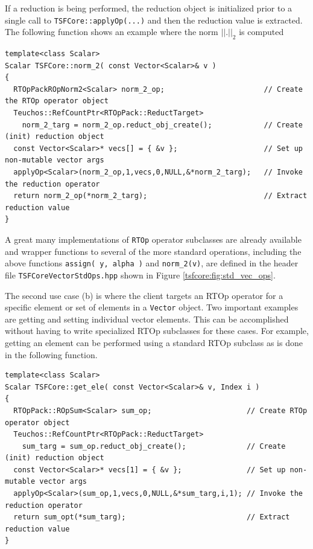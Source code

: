 If a reduction is being performed, the reduction object is initialized
prior to a single call to \texttt{TSFCore::applyOp(\-...)} and then the
reduction value is extracted.  The following function shows an example
where the norm $||.||_2$ is computed

{\scriptsize\begin{verbatim}
template<class Scalar>
Scalar TSFCore::norm_2( const Vector<Scalar>& v )
{
  RTOpPackROpNorm2<Scalar> norm_2_op;                       // Create the RTOp operator object
  Teuchos::RefCountPtr<RTOpPack::ReductTarget>
    norm_2_targ = norm_2_op.reduct_obj_create();            // Create (init) reduction object
  const Vector<Scalar>* vecs[] = { &v };                    // Set up non-mutable vector args
  applyOp<Scalar>(norm_2_op,1,vecs,0,NULL,&*norm_2_targ);   // Invoke the reduction operator
  return norm_2_op(*norm_2_targ);                           // Extract reduction value
}
\end{verbatim}}

{}\noindent{}A great many implementations of \texttt{RTOp} operator subclasses are
already available and wrapper functions to several of the more
standard operations, including the above functions
\texttt{assign( y, alpha )} and \texttt{norm\_2(v)},
are defined in the header file \texttt{TSFCore\-Vector\-Std\-Ops.hpp}
shown in Figure \ref{tsfcore:fig:std_vec_ops}.

The second use case (b) is where the client targets an RTOp operator
for a specific element or set of elements in a \texttt{Vector} object.
Two important examples are getting and setting individual vector
elements.  This can be accomplished without having to write specialized
RTOp subclasses for these cases.  For example, getting an element
can be performed using a standard RTOp subclass as is done
in the following function.

{\scriptsize\begin{verbatim}
template<class Scalar>
Scalar TSFCore::get_ele( const Vector<Scalar>& v, Index i )
{
  RTOpPack::ROpSum<Scalar> sum_op;                      // Create RTOp operator object
  Teuchos::RefCountPtr<RTOpPack::ReductTarget>
    sum_targ = sum_op.reduct_obj_create();              // Create (init) reduction object
  const Vector<Scalar>* vecs[1] = { &v };               // Set up non-mutable vector args
  applyOp<Scalar>(sum_op,1,vecs,0,NULL,&*sum_targ,i,1); // Invoke the reduction operator
  return sum_opt(*sum_targ);                            // Extract reduction value
}
\end{verbatim}}

